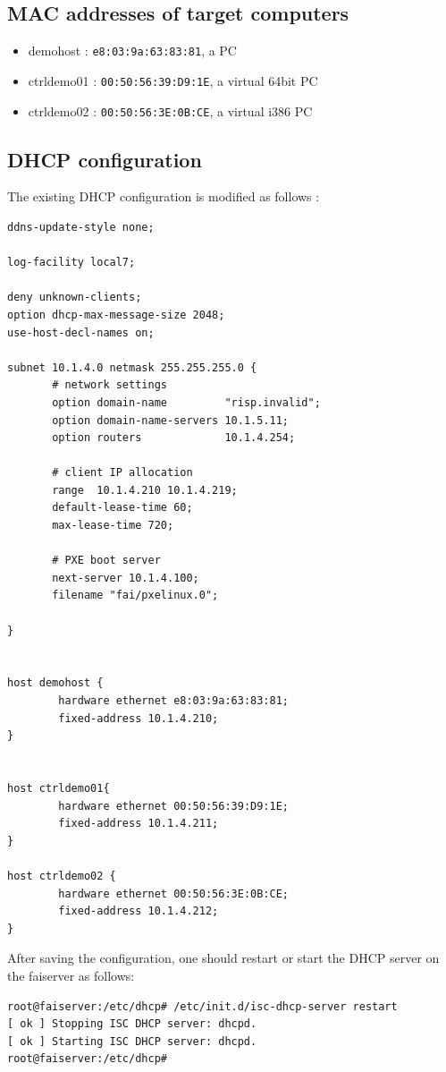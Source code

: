 \documentclass[11pt
  , a4paper
  , article
  , oneside
]{memoir}
\begin{document}
\subsection{MAC addresses of target computers}
\begin{itemize}
  \item demohost   : \texttt{e8:03:9a:63:83:81}, a PC
  \item ctrldemo01 : \texttt{00:50:56:39:D9:1E}, a virtual 64bit PC
  \item ctrldemo02 : \texttt{00:50:56:3E:0B:CE}, a virtual i386 PC
\end{itemize}
\subsection{DHCP configuration}
The existing DHCP configuration is modified as follows :
\begin{lstlisting}
ddns-update-style none;

log-facility local7;
 
deny unknown-clients;
option dhcp-max-message-size 2048;
use-host-decl-names on;

subnet 10.1.4.0 netmask 255.255.255.0 {
       # network settings
       option domain-name         "risp.invalid";
       option domain-name-servers 10.1.5.11;
       option routers             10.1.4.254;

       # client IP allocation
       range  10.1.4.210 10.1.4.219;
       default-lease-time 60;
       max-lease-time 720;

       # PXE boot server
       next-server 10.1.4.100;
       filename "fai/pxelinux.0";

}


host demohost {
        hardware ethernet e8:03:9a:63:83:81;
        fixed-address 10.1.4.210;
}


host ctrldemo01{
        hardware ethernet 00:50:56:39:D9:1E;
        fixed-address 10.1.4.211;
}

host ctrldemo02 {
        hardware ethernet 00:50:56:3E:0B:CE;
        fixed-address 10.1.4.212;
}

\end{lstlisting}
After saving the configuration, one should restart or start the DHCP server on the faiserver as follows:     
\begin{lstlisting}
root@faiserver:/etc/dhcp# /etc/init.d/isc-dhcp-server restart
[ ok ] Stopping ISC DHCP server: dhcpd.
[ ok ] Starting ISC DHCP server: dhcpd.
root@faiserver:/etc/dhcp# 
\end{lstlisting}
\end{document}
